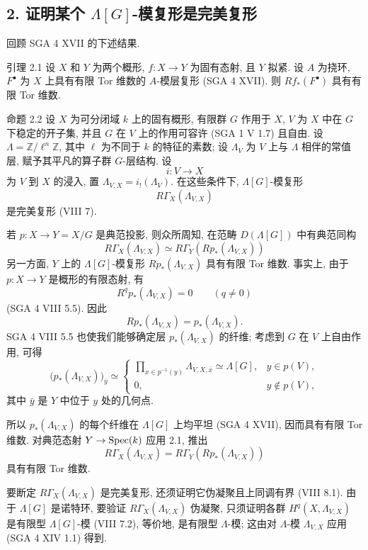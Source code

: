 \subsection*{2. 证明某个 $\Lambda[G]$-模复形是完美复形}

回顾 SGA 4 XVII 的下述结果.

\begin{statement}{引理 2.1}
设 $X$ 和 $Y$ 为两个概形, $f:X\to Y$ 为固有态射, 且 $Y$ 拟紧. 设 $A$ 为挠环, $F^\bullet$ 为 $X$ 上具有有限 Tor 维数的 $A$-模层复形 (SGA 4 XVII). 则 $Rf_*(F^\bullet)$ 具有有限 Tor 维数.
\end{statement}

\begin{statement}{命题 2.2}
设 $X$ 为可分闭域 $k$ 上的固有概形, 有限群 $G$ 作用于 $X$, $V$ 为 $X$ 中在 $G$ 下稳定的开子集, 并且 $G$ 在 $V$ 上的作用可容许 (SGA 1 V 1.7) 且自由. 设 $\Lambda=\mathbb Z/\ell^n\mathbb Z$, 其中 $\ell$ 为不同于 $k$ 的特征的素数; 设 $\Lambda_V$ 为 $V$ 上与 $\Lambda$ 相伴的常值层, 赋予其平凡的算子群 $G$-层结构. 设
\[
i:V\longrightarrow X
\]
为 $V$ 到 $X$ 的浸入, 置 $\Lambda_{V,X}=i_!(\Lambda_V)$. 在这些条件下, $\Lambda[G]$-模复形
\[
R\Gamma_X(\Lambda_{V,X})
\]
是完美复形 (VIII 7).
\end{statement}

\begin{prooftext}
若 $p:X\to Y=X/G$ 是典范投影, 则众所周知, 在范畴 $D(\Lambda[G])$ 中有典范同构
\[
R\Gamma_X(\Lambda_{V,X})\simeq R\Gamma_Y(Rp_*(\Lambda_{V,X}))
\]
另一方面, $Y$ 上的 $\Lambda[G]$-模复形 $Rp_*(\Lambda_{V,X})$ 具有有限 Tor 维数. 事实上, 由于 $p:X\to Y$ 是概形的有限态射, 有
\[
R^q p_*(\Lambda_{V,X})=0\qquad(q\ne0)
\]
(SGA 4 VIII 5.5). 因此
\[
Rp_*(\Lambda_{V,X})=p_*(\Lambda_{V,X}).
\]
SGA 4 VIII 5.5 也使我们能够确定层 $p_*(\Lambda_{V,X})$ 的纤维; 考虑到 $G$ 在 $V$ 上自由作用, 可得
\[
\bigl(p_*(\Lambda_{V,X})\bigr)_{\bar y}\simeq
\begin{cases}
\displaystyle \prod_{x\in p^{-1}(y)}\Lambda_{V,X,\bar x}\simeq \Lambda[G],& y\in p(V),\\[1em]
0,& y\notin p(V),
\end{cases}
\]
其中 $\bar y$ 是 $Y$ 中位于 $y$ 处的几何点.

所以 $p_*(\Lambda_{V,X})$ 的每个纤维在 $\Lambda[G]$ 上均平坦 (SGA 4 XVII), 因而具有有限 Tor 维数. 对典范态射 $Y\to\operatorname{Spec}(k)$ 应用 2.1, 推出
\[
R\Gamma_X(\Lambda_{V,X})=R\Gamma_Y(Rp_*(\Lambda_{V,X}))
\]
具有有限 Tor 维数.

要断定 $R\Gamma_X(\Lambda_{V,X})$ 是完美复形, 还须证明它伪凝聚且上同调有界 (VIII 8.1). 由于 $\Lambda[G]$ 是诺特环, 要验证 $R\Gamma_X(\Lambda_{V,X})$ 伪凝聚, 只须证明各群 $H^q(X,\Lambda_{V,X})$ 是有限型 $\Lambda[G]$-模 (VIII 7.2), 等价地, 是有限型 $\Lambda$-模; 这由对 $\Lambda$-模 $\Lambda_{V,X}$ 应用 (SGA 4 XIV 1.1) 得到.
\end{prooftext}


